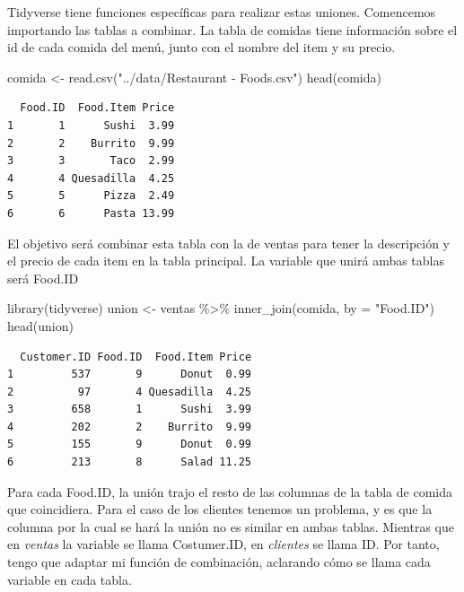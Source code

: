 \documentclass[
  letterpaper,
  DIV=11,
  numbers=noendperiod]{scrreprt}
\newenvironment{Shaded}{\begin{snugshade}}{\end{snugshade}}
\newcommand{\AttributeTok}[1]{\textcolor[rgb]{0.40,0.45,0.13}{#1}}
\newcommand{\FunctionTok}[1]{\textcolor[rgb]{0.28,0.35,0.67}{#1}}
\newcommand{\NormalTok}[1]{\textcolor[rgb]{0.00,0.23,0.31}{#1}}
\newcommand{\OtherTok}[1]{\textcolor[rgb]{0.00,0.23,0.31}{#1}}
\newcommand{\SpecialCharTok}[1]{\textcolor[rgb]{0.37,0.37,0.37}{#1}}
\newcommand{\StringTok}[1]{\textcolor[rgb]{0.13,0.47,0.30}{#1}}
\begin{document}
Tidyverse tiene funciones específicas para realizar estas uniones.
Comencemos importando las tablas a combinar. La tabla de comidas tiene
información sobre el id de cada comida del menú, junto con el nombre del
item y su precio.

\begin{Shaded}
\begin{Highlighting}[]
\NormalTok{comida }\OtherTok{\textless{}{-}} \FunctionTok{read.csv}\NormalTok{(}\StringTok{"../data/Restaurant {-} Foods.csv"}\NormalTok{)}
\FunctionTok{head}\NormalTok{(comida)}
\end{Highlighting}
\end{Shaded}

\begin{verbatim}
  Food.ID  Food.Item Price
1       1      Sushi  3.99
2       2    Burrito  9.99
3       3       Taco  2.99
4       4 Quesadilla  4.25
5       5      Pizza  2.49
6       6      Pasta 13.99
\end{verbatim}

El objetivo será combinar esta tabla con la de ventas para tener la
descripción y el precio de cada item en la tabla principal. La variable
que unirá ambas tablas será Food.ID

\begin{Shaded}
\begin{Highlighting}[]
\FunctionTok{library}\NormalTok{(tidyverse)}
\NormalTok{union }\OtherTok{\textless{}{-}}\NormalTok{ ventas }\SpecialCharTok{\%\textgreater{}\%} \FunctionTok{inner\_join}\NormalTok{(comida, }\AttributeTok{by =} \StringTok{"Food.ID"}\NormalTok{)}
\FunctionTok{head}\NormalTok{(union)}
\end{Highlighting}
\end{Shaded}

\begin{verbatim}
  Customer.ID Food.ID  Food.Item Price
1         537       9      Donut  0.99
2          97       4 Quesadilla  4.25
3         658       1      Sushi  3.99
4         202       2    Burrito  9.99
5         155       9      Donut  0.99
6         213       8      Salad 11.25
\end{verbatim}

Para cada Food.ID, la unión trajo el resto de las columnas de la tabla
de comida que coincidiera. Para el caso de los clientes tenemos un
problema, y es que la columna por la cual se hará la unión no es similar
en ambas tablas. Mientras que en \emph{ventas} la variable se llama
Costumer.ID, en \emph{clientes} se llama ID. Por tanto, tengo que
adaptar mi función de combinación, aclarando cómo se llama cada variable
en cada tabla.
\end{document}
